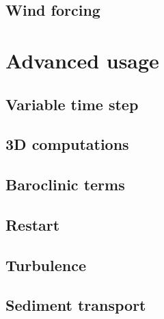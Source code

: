\documentclass{report}
\newcommand{\todo}[1]{This section still has to be written by #1}
\begin{document}



		\subsection{Wind forcing}
		

	\section{Advanced usage}

		\subsection{Variable time step}
		

		\subsection{3D computations}
		

		\subsection{Baroclinic terms}
		

		\subsection{Restart}
		

		\subsection{Turbulence}
		

		\subsection{Sediment transport}
		
\end{document}
